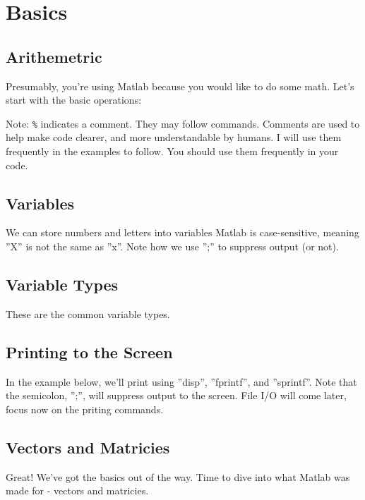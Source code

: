 
\pagebreak
\section{Basics}

\subsection{Arithemetric}
Presumably, you're using Matlab because you would like to do some math.
 Let's start with the basic operations:

\begin{quote}

\end{quote}
\noindent Note: \texttt{\%} indicates a comment.
 They may follow commands.
 Comments are used to help make code clearer, and more understandable by humans.
 I will use them frequently in the examples to follow.
 You should use them frequently in your code.

\pagebreak
\subsection{Variables}
We can store numbers and letters into variables
 Matlab is case-sensitive, meaning ''X'' is not the same as ''x''.
 Note how we use '';'' to suppress output (or not).

\begin{quote}

\end{quote}

\pagebreak
\subsection{Variable Types}
These are the common variable types.

\begin{quote}

\end{quote}

\pagebreak
\subsection{Printing to the Screen}
In the example below, we'll print using
 ''disp'',
 ''fprintf'',
 and ''sprintf''.
 Note that the semicolon, '';'', will suppress output to the screen.
 File I/O will come later, focus now on the priting commands.
\begin{quote}

\end{quote}

\pagebreak
\subsection{Vectors and Matricies}
Great! We've got the basics out of the way.
 Time to dive into what Matlab was made for - vectors and matricies.

\begin{quote}

\end{quote}
